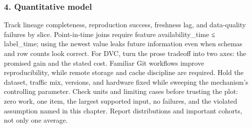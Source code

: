 \subsubsection*{4. Quantitative model}
Track lineage completeness, reproduction success, freshness lag, and data-quality failures by slice. Point-in-time joins require feature availability\_time ≤ label\_time; using the newest value leaks future information even when schemas and row counts look correct.
For DVC, turn the prose tradeoff into two axes: the promised gain and the stated cost. Familiar Git workflows improve reproducibility, while remote storage and cache discipline are required. Hold the dataset, traffic mix, versions, and hardware fixed while sweeping the mechanism's controlling parameter.
Check units and limiting cases before trusting the plot: zero work, one item, the largest supported input, no failures, and the violated assumption named in this chapter. Report distributions and important cohorts, not only one average.
